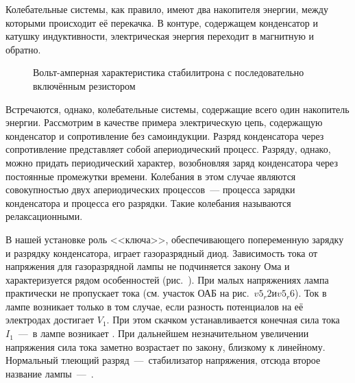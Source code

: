 


Колебательные системы, как правило, имеют два накопителя энергии, между
которыми происходит её перекачка. В контуре,
содержащем конденсатор и катушку индуктивности, электрическая энергия переходит
в магнитную и обратно.

\begin{figure}[h!]
	\caption{Вольт-амперная характеристика стабилитрона с последовательно
включённым резистором}
\end{figure}

Встречаются, однако, колебательные системы, содержащие всего один накопитель
энергии. Рассмотрим в качестве примера
электрическую цепь, содержащую конденсатор и сопротивление без самоиндукции.
Разряд конденсатора через сопротивление
представляет собой апериодический процесс. Разряду, однако, можно придать
периодический характер, возобновляя заряд
конденсатора через постоянные промежутки времени. Колебания в этом случае
являются совокупностью двух апериодических
процессов~--- процесса зарядки конденсатора и процесса его разрядки. Такие
колебания называются релаксационными.

В нашей установке роль <<ключа>>, обеспечивающего попеременную зарядку и
разрядку конденсатора, играет газоразрядный
диод. Зависимость тока от напряжения для газоразрядной лампы не подчиняется
закону Ома и характеризуется рядом
особенностей (рис.~). При малых напряжениях лампа
практически не пропускает тока (см. участок ОАБ на рис.~$v5_r2 и v5_r6$).
Ток в лампе возникает только в том случае, если разность потенциалов на её
электродах достигает  $V_1$. 
При этом скачком устанавливается конечная сила тока $I_1$~---~в лампе возникает
. При дальнейшем незначительном увеличении
напряжения сила тока заметно возрастает по закону, близкому к линейному. 
Нормальный тлеющий разряд~---~стабилизатор напряжения, отсюда второе название 
лампы~---~.


